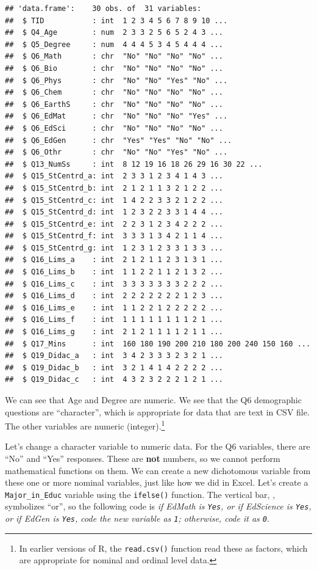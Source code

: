 \documentclass[
]{article}
\begin{document}
\begin{verbatim}
## 'data.frame':    30 obs. of  31 variables:
##  $ TID           : int  1 2 3 4 5 6 7 8 9 10 ...
##  $ Q4_Age        : num  2 3 3 2 5 6 5 2 4 3 ...
##  $ Q5_Degree     : num  4 4 4 5 3 4 5 4 4 4 ...
##  $ Q6_Math       : chr  "No" "No" "No" "No" ...
##  $ Q6_Bio        : chr  "No" "No" "No" "No" ...
##  $ Q6_Phys       : chr  "No" "No" "Yes" "No" ...
##  $ Q6_Chem       : chr  "No" "No" "No" "No" ...
##  $ Q6_EarthS     : chr  "No" "No" "No" "No" ...
##  $ Q6_EdMat      : chr  "No" "No" "No" "Yes" ...
##  $ Q6_EdSci      : chr  "No" "No" "No" "No" ...
##  $ Q6_EdGen      : chr  "Yes" "Yes" "No" "No" ...
##  $ Q6_Othr       : chr  "No" "No" "Yes" "No" ...
##  $ Q13_NumSs     : int  8 12 19 16 18 26 29 16 30 22 ...
##  $ Q15_StCentrd_a: int  2 3 3 1 2 3 4 1 4 3 ...
##  $ Q15_StCentrd_b: int  2 1 2 1 1 3 2 1 2 2 ...
##  $ Q15_StCentrd_c: int  1 4 2 2 3 3 2 1 2 2 ...
##  $ Q15_StCentrd_d: int  1 2 3 2 2 3 3 1 4 4 ...
##  $ Q15_StCentrd_e: int  2 2 3 1 2 3 4 2 2 2 ...
##  $ Q15_StCentrd_f: int  3 3 3 1 3 4 2 1 1 4 ...
##  $ Q15_StCentrd_g: int  1 2 3 1 2 3 3 1 3 3 ...
##  $ Q16_Lims_a    : int  2 1 2 1 1 2 3 1 3 1 ...
##  $ Q16_Lims_b    : int  1 1 2 2 1 1 2 1 3 2 ...
##  $ Q16_Lims_c    : int  3 3 3 3 3 3 3 2 2 2 ...
##  $ Q16_Lims_d    : int  2 2 2 2 2 2 2 1 2 3 ...
##  $ Q16_Lims_e    : int  1 1 2 2 1 2 2 2 2 2 ...
##  $ Q16_Lims_f    : int  1 1 1 1 1 1 1 1 2 1 ...
##  $ Q16_Lims_g    : int  2 1 2 1 1 1 1 2 1 1 ...
##  $ Q17_Mins      : int  160 180 190 200 210 180 200 240 150 160 ...
##  $ Q19_Didac_a   : int  3 4 2 3 3 3 2 3 2 1 ...
##  $ Q19_Didac_b   : int  3 2 1 4 1 4 2 2 2 2 ...
##  $ Q19_Didac_c   : int  4 3 2 3 2 2 2 1 2 1 ...
\end{verbatim}

We can see that Age and Degree are numeric. We see that the Q6 demographic questions are ``character'', which is appropriate for data that are text in CSV file. The other variables are numeric (integer).\footnote{In earlier versions of R, the \texttt{read.csv()} function read these as factors, which are appropriate for nominal and ordinal level data.}

Let's change a character variable to numeric data. For the Q6 variables, there are ``No'' and ``Yes'' responses. These are \textbf{not} numbers, so we cannot perform mathematical functions on them. We can create a new dichotomous variable from these one or more nominal variables, just like how we did in Excel. Let's create a \texttt{Major\_in\_Educ} variable using the \texttt{ifelse()} function. The vertical bar, \textbar, symbolizes ``or'', so the following code is \emph{if EdMath is \texttt{Yes}, or if EdScience is \texttt{Yes}, or if EdGen is \texttt{Yes}, code the new variable as \texttt{1}; otherwise, code it as \texttt{0}}.
\end{document}
